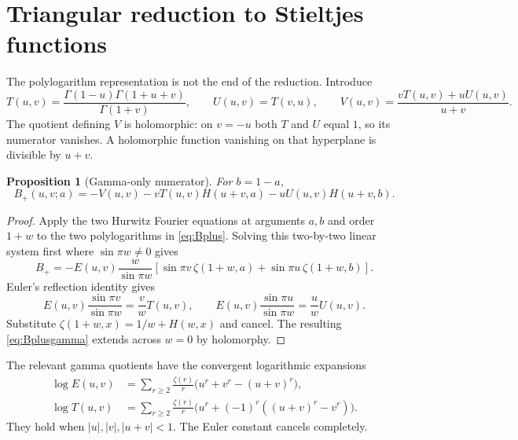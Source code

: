 \documentclass[11pt]{article}
\numberwithin{equation}{section}
\newtheorem{proposition}[theorem]{Proposition}
\theoremstyle{definition}\newtheorem{definition}[theorem]{Definition}
\theoremstyle{remark}\newtheorem{remark}[theorem]{Remark}
\begin{document}
\section{Triangular reduction to Stieltjes functions}
\label{sec:triangular}

The polylogarithm representation is not the end of the reduction. Introduce
\begin{equation}\label{eq:Fgamma}
 T(u,v)=\frac{\Gamma(1-u)\Gamma(1+u+v)}{\Gamma(1+v)},\qquad
 U(u,v)=T(v,u),\qquad
 V(u,v)=\frac{vT(u,v)+uU(u,v)}{u+v}.
\end{equation}
The quotient defining $V$ is holomorphic: on $v=-u$ both $T$ and $U$
equal $1$, so its numerator vanishes. A holomorphic function vanishing on
that hyperplane is divisible by $u+v$.

\begin{proposition}[Gamma-only numerator]\label{prop:gammaonly}
For $b=1-a$,
\begin{equation}\label{eq:Bplusgamma}
 B_+(u,v;a)=-V(u,v)-vT(u,v)H(u+v,a)-uU(u,v)H(u+v,b).
\end{equation}
\end{proposition}
\begin{proof}
Apply the two Hurwitz Fourier equations at arguments $a,b$ and order
$1+w$ to the two polylogarithms in \eqref{eq:Bplus}. Solving this
two-by-two linear system first where $\sin\pi w\ne0$ gives
\[
 B_+=-E(u,v)\frac{w}{\sin\pi w}
 \left[\sin\pi v\,\zeta(1+w,a)+\sin\pi u\,\zeta(1+w,b)\right].
\]
Euler's reflection identity gives
\[
 E(u,v)\frac{\sin\pi v}{\sin\pi w}=\frac v w T(u,v),\qquad
 E(u,v)\frac{\sin\pi u}{\sin\pi w}=\frac u w U(u,v).
\]
Substitute $\zeta(1+w,x)=1/w+H(w,x)$ and cancel. The resulting
\eqref{eq:Bplusgamma} extends across $w=0$ by holomorphy.
\end{proof}

The relevant gamma quotients have the convergent logarithmic expansions
\begin{align}
 \log E(u,v)&=\sum_{r\ge2}\frac{\zeta(r)}r
                 \bigl(u^r+v^r-(u+v)^r\bigr),\label{eq:logE}\\
 \log T(u,v)&=\sum_{r\ge2}\frac{\zeta(r)}r
                 \bigl(u^r+(-1)^r((u+v)^r-v^r)\bigr).
                 \label{eq:logT}
\end{align}
They hold when $|u|,|v|,|u+v|<1$. The Euler constant cancels completely.
\end{document}
